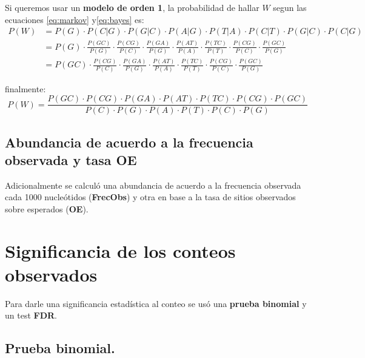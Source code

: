 \documentclass[
]{book}
\begin{document}
Si queremos usar un \textbf{modelo de orden 1}, la probabilidad de hallar \(W\) segun las ecuaciones \eqref{eq:markov} y\eqref{eq:bayes} es:
\begin{equation}
\begin{split}
P(W) & = P(G) \cdot P(C|G) \cdot P(G|C) \cdot P(A|G) \cdot P(T|A) \cdot P(C|T) \cdot P(G|C) \cdot P(C|G)\\
& = {P(G)} \cdot \frac{P(GC)}{P(G)} \cdot \frac{P(CG)}{P(C)} \cdot \frac{P(GA)}{P(G)} \cdot \frac{P(AT)}{P(A)} \cdot \frac{P(TC)}{P(T)} \cdot \frac{P(CG)}{P(C)} \cdot \frac{P(GC)}{P(G)}\\
& = P(GC) \cdot \frac{P(CG)}{P(C)} \cdot \frac{P(GA)}{P(G)} \cdot \frac{P(AT)}{P(A)} \cdot \frac{P(TC)}{P(T)} \cdot \frac{P(CG)}{P(C)} \cdot \frac{P(GC)}{P(G)}
\end{split}
\end{equation}

finalmente:
\begin{equation}
P(W) = \frac{P(GC) \cdot P(CG) \cdot P(GA) \cdot P(AT) \cdot P(TC) \cdot P(CG) \cdot P(GC)}{P(C) \cdot P(G) \cdot P(A) \cdot P(T) \cdot P(C) \cdot P(G)}
\label{eq:Markov1HIP}
\end{equation}

\hypertarget{abundancia-de-acuerdo-a-la-frecuencia-observada-y-tasa-oe}{%
\subsection{Abundancia de acuerdo a la frecuencia observada y tasa OE}\label{abundancia-de-acuerdo-a-la-frecuencia-observada-y-tasa-oe}}

Adicionalmente se calculó una abundancia de acuerdo a la frecuencia observada cada 1000 nucleótidos (\textbf{FrecObs}) y otra en base a la tasa de sitios observados sobre esperados (\textbf{OE}).

\hypertarget{significancia-de-los-conteos-observados}{%
\section{Significancia de los conteos observados}\label{significancia-de-los-conteos-observados}}

Para darle una significancia estadística al conteo se usó una \textbf{prueba binomial} y un test \textbf{FDR}.

\hypertarget{prueba-binomial.}{%
\subsection{Prueba binomial.}\label{prueba-binomial.}}
\end{document}

